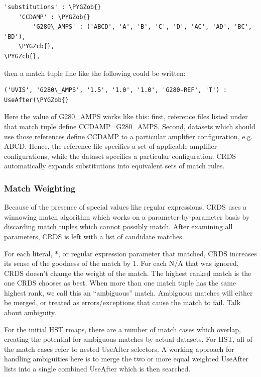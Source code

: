 \documentclass[letterpaper,10pt,english]{sphinxmanual}
\def\PYGZob{\char`\{}
\def\PYGZcb{\char`\}}
\begin{document}
\begin{Verbatim}[commandchars=\\\{\}]
'substitutions' : \PYGZob{}
    'CCDAMP' : \PYGZob{}
        'G280\_AMPS' : ('ABCD', 'A', 'B', 'C', 'D', 'AC', 'AD', 'BC', 'BD'),
    \PYGZcb{},
\PYGZcb{},
\end{Verbatim}

then a match tuple line like the following could be written:

\begin{Verbatim}[commandchars=\\\{\}]
('UVIS', 'G280\_AMPS', '1.5', '1.0', '1.0', 'G280-REF', 'T') : UseAfter(\PYGZob{}
\end{Verbatim}

Here the value of G280\_AMPS works like this:  first,   reference files listed
under that match tuple define CCDAMP=G280\_AMPS.   Second, datasets which should
use those references define CCDAMP to a particular amplifier configuration,
e.g.  ABCD.   Hence,  the reference file specifies a set of applicable
amplifier configurations,  while the dataset specifies a particular
configuration.   CRDS automatically expands substitutions into equivalent sets
of match rules.


\subsubsection{Match Weighting}
\label{rmap_syntax:match-weighting}
Because of the presence of special values like regular expressions, CRDS uses a
winnowing match algorithm which works on a parameter-by-parameter basis by
discarding match tuples which cannot possibly match. After examining all
parameters,   CRDS is left with a list of candidate matches.

For each literal, *, or regular expression parameter that matched,  CRDS
increases its sense of the goodness of the match by 1.   For each N/A that was
ignored, CRDS doesn't change the weight of the match.   The highest ranked match
is the one CRDS chooses as best.   When more than one match tuple has the same
highest rank, we call this an ``ambiguous'' match.   Ambiguous matches will
either be merged,  or treated as errors/exceptions that cause the match to fail.
Talk about ambiguity.

For the initial HST rmaps, there are a number of match cases which overlap,
creating the potential for ambiguous matches by actual datasets.   For HST,  all
of the match cases refer to nested UseAfter selectors.  A working approach for
handling ambiguities here is to merge the two or more equal weighted UseAfter
lists into a single combined UseAfter which is then searched.
\end{document}
